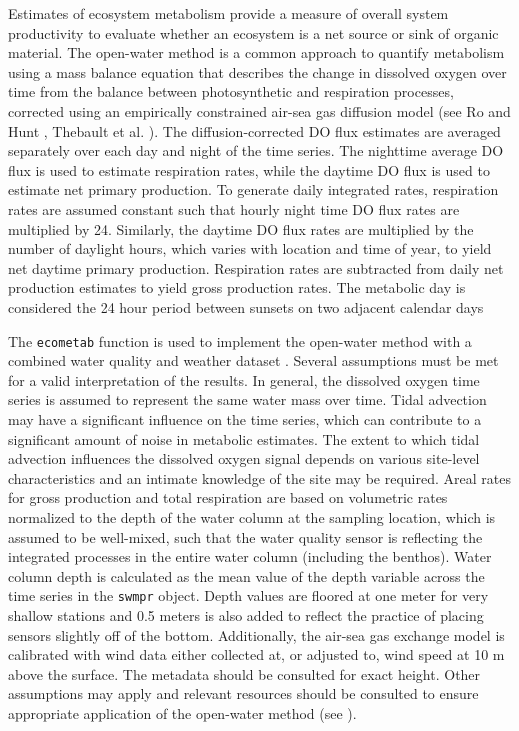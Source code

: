 \documentclass[10pt,letterpaper]{article}\usepackage[]{graphicx}\usepackage[]{color}
\begin{document}
Estimates of ecosystem metabolism provide a measure of overall system productivity to evaluate whether an ecosystem is a net source or sink of organic material.  The open-water method \cite{Odum56} is a common approach to quantify metabolism using a mass balance equation that describes the change in dissolved oxygen over time from the balance between photosynthetic and respiration processes, corrected using an empirically constrained air-sea gas diffusion model (see Ro and Hunt \cite{Ro06}, Thebault et al. \cite{Thebault08}). The diffusion-corrected \ac{DO} flux estimates are averaged separately over each day and night of the time series. The nighttime average \ac{DO} flux is used to estimate respiration rates, while the daytime \ac{DO} flux is used to estimate net primary production. To generate daily integrated rates, respiration rates are assumed constant such that hourly night time \ac{DO} flux rates are multiplied by 24. Similarly, the daytime \ac{DO} flux rates are multiplied by the number of daylight hours, which varies with location and time of year, to yield net daytime primary production. Respiration rates are subtracted from daily net production estimates to yield gross production rates. The metabolic day is considered the 24 hour period between sunsets on two adjacent calendar days  

The \texttt{ecometab} function is used to implement the open-water method with a combined water quality and weather dataset \cite{Caffrey14}.  Several assumptions must be met for a valid interpretation of the results.  In general, the dissolved oxygen time series is assumed to represent the same water mass over time.  Tidal advection may have a significant influence on the time series, which can contribute to a significant amount of noise in metabolic estimates.  The extent to which tidal advection influences the dissolved oxygen signal depends on various site-level characteristics and an intimate knowledge of the site may be required.  Areal rates for gross production and total respiration are based on volumetric rates normalized to the depth of the water column at the sampling location, which is assumed to be well-mixed, such that the water quality sensor is reflecting the integrated processes in the entire water column (including the benthos).  Water column depth is calculated as the mean value of the depth variable across the time series in the \texttt{swmpr} object. Depth values are floored at one meter for very shallow stations and 0.5 meters is also added to reflect the practice of placing sensors slightly off of the bottom.  Additionally, the air-sea gas exchange model is calibrated with wind data either collected at, or adjusted to, wind speed at 10 m above the surface.  The metadata should be consulted for exact height. Other assumptions may apply and relevant resources should be consulted to ensure appropriate application of the open-water method (see \cite{Kemp12,Needoba12}).
\end{document}
